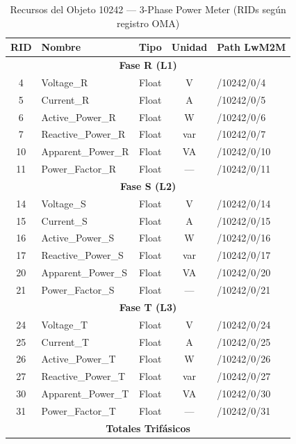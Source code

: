 \begin{table}[H]
\centering
\caption{Recursos del Objeto 10242 --- 3-Phase Power Meter (RIDs según registro OMA)}
\label{tab:lwm2m-ipso-objects}
{\footnotesize
\setlength{\tabcolsep}{4pt}
\renewcommand{\arraystretch}{0.85}
\begin{tabular}{|c|l|c|c|l|}
\hline
\rowcolor{gray!20}
\textbf{RID} & \textbf{Nombre} & \textbf{Tipo} & \textbf{Unidad} & \textbf{Path LwM2M} \\
\hline
\multicolumn{5}{|c|}{\cellcolor{gray!10}\textbf{Fase R (L1)}} \\
\hline
4  & Voltage\_R       & Float & V    & /10242/0/4  \\
5  & Current\_R       & Float & A    & /10242/0/5  \\
6  & Active\_Power\_R  & Float & W    & /10242/0/6  \\
7  & Reactive\_Power\_R& Float & var  & /10242/0/7  \\
10 & Apparent\_Power\_R& Float & VA   & /10242/0/10 \\
11 & Power\_Factor\_R  & Float & ---  & /10242/0/11 \\
\hline
\multicolumn{5}{|c|}{\cellcolor{gray!10}\textbf{Fase S (L2)}} \\
\hline
14 & Voltage\_S       & Float & V    & /10242/0/14 \\
15 & Current\_S       & Float & A    & /10242/0/15 \\
16 & Active\_Power\_S  & Float & W    & /10242/0/16 \\
17 & Reactive\_Power\_S& Float & var  & /10242/0/17 \\
20 & Apparent\_Power\_S& Float & VA   & /10242/0/20 \\
21 & Power\_Factor\_S  & Float & ---  & /10242/0/21 \\
\hline
\multicolumn{5}{|c|}{\cellcolor{gray!10}\textbf{Fase T (L3)}} \\
\hline
24 & Voltage\_T       & Float & V    & /10242/0/24 \\
25 & Current\_T       & Float & A    & /10242/0/25 \\
26 & Active\_Power\_T  & Float & W    & /10242/0/26 \\
27 & Reactive\_Power\_T& Float & var  & /10242/0/27 \\
30 & Apparent\_Power\_T& Float & VA   & /10242/0/30 \\
31 & Power\_Factor\_T  & Float & ---  & /10242/0/31 \\
\hline
\multicolumn{5}{|c|}{\cellcolor{gray!10}\textbf{Totales Trifásicos}} \\

\end{tabular}}
\end{table}
